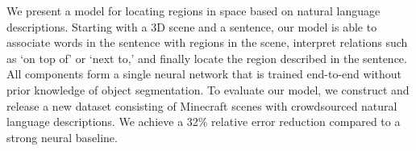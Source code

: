 We present a model for locating regions in space based on natural language descriptions. Starting with a 3D scene and a sentence, our model is able to associate words in the sentence with regions in the scene, interpret relations such as `on top of' or `next to,' and finally locate the region described in the sentence. All components form a single neural network that is trained end-to-end without prior knowledge of object segmentation. To evaluate our model, we construct and release a new dataset consisting of Minecraft scenes with crowdsourced natural language descriptions. We achieve a 32\% relative error reduction compared to a strong neural baseline.
